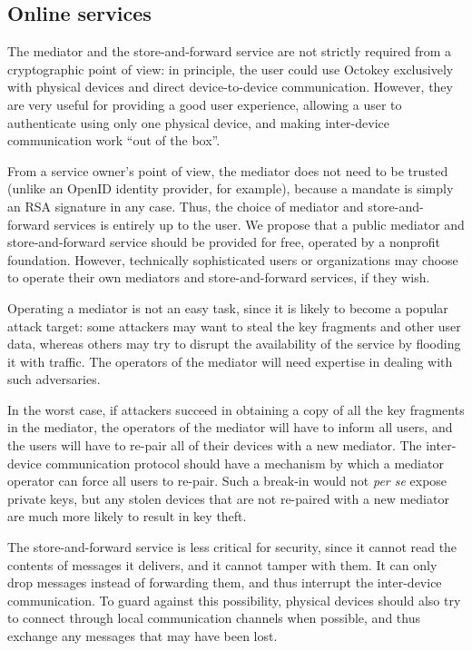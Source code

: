 \subsection{Online services}\label{sec:mediator-sec}

The mediator and the store-and-forward service are not strictly required from a cryptographic point
of view: in principle, the user could use Octokey exclusively with physical devices and direct
device-to-device communication. However, they are very useful for providing a good user experience,
allowing a user to authenticate using only one physical device, and making inter-device
communication work ``out of the box''.

From a service owner's point of view, the mediator does not need to be trusted (unlike an OpenID
identity provider, for example), because a mandate is simply an RSA signature in any case. Thus, the
choice of mediator and store-and-forward services is entirely up to the user. We propose that a
public mediator and store-and-forward service should be provided for free, operated by a nonprofit
foundation. However, technically sophisticated users or organizations may choose to operate their
own mediators and store-and-forward services, if they wish.

Operating a mediator is not an easy task, since it is likely to become a popular attack target: some
attackers may want to steal the key fragments and other user data, whereas others may try to disrupt
the availability of the service by flooding it with traffic. The operators of the mediator will need
expertise in dealing with such adversaries.

In the worst case, if attackers succeed in obtaining a copy of all the key fragments in the
mediator, the operators of the mediator will have to inform all users, and the users will have to
re-pair all of their devices with a new mediator. The inter-device communication protocol should
have a mechanism by which a mediator operator can force all users to re-pair. Such a break-in would
not \emph{per se} expose private keys, but any stolen devices that are not re-paired with a new
mediator are much more likely to result in key theft.

The store-and-forward service is less critical for security, since it cannot read the contents of
messages it delivers, and it cannot tamper with them. It can only drop messages instead of
forwarding them, and thus interrupt the inter-device communication. To guard against this
possibility, physical devices should also try to connect through local communication channels when
possible, and thus exchange any messages that may have been lost.

